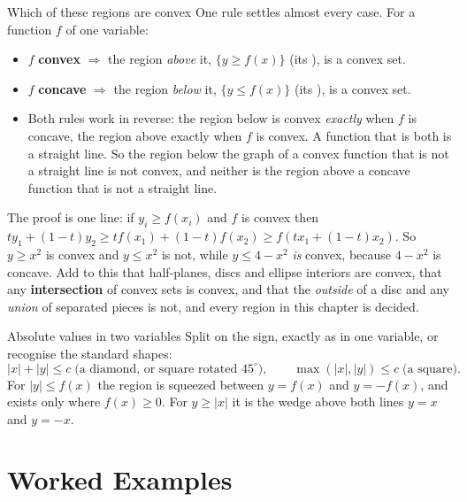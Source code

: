 \begin{rulebox}{Which of these regions are convex}
One rule settles almost every case. For a function $f$ of one variable:
\begin{itemize}[leftmargin=1.6em,itemsep=0.3ex]
  \item $f$ \textbf{convex} $\Longrightarrow$ the region \emph{above} it,
        $\{y\ge f(x)\}$ (its ), is a convex set.
  \item $f$ \textbf{concave} $\Longrightarrow$ the region \emph{below} it,
        $\{y\le f(x)\}$ (its ), is a convex set.
  \item Both rules work in reverse: the region below is convex
        \emph{exactly} when $f$ is concave, the region above exactly when
        $f$ is convex. A function that is both is a straight line. So the
        region below the graph of a convex function that is not a straight
        line is not convex, and neither is the region above a concave
        function that is not a straight line.
\end{itemize}
The proof is one line: if $y_{i}\ge f(x_{i})$ and $f$ is convex then
$ty_{1}+(1-t)y_{2}\ge tf(x_{1})+(1-t)f(x_{2})\ge f(tx_{1}+(1-t)x_{2})$.
So $y\ge x^{2}$ is convex and $y\le x^{2}$ is not, while $y\le4-x^{2}$
\emph{is} convex, because $4-x^{2}$ is concave. Add to this that
half-planes, discs and ellipse interiors are convex, that any
\textbf{intersection} of convex sets is convex, and that the
\emph{outside} of a disc and any \emph{union} of separated pieces is not,
and every region in this chapter is decided.
\end{rulebox}

\begin{rulebox}{Absolute values in two variables}
Split on the sign, exactly as in one variable, or recognise the standard
shapes:
\[
  |x|+|y|\le c \;\text{(a diamond, or square rotated }45^{\circ}),\qquad
  \max(|x|,|y|)\le c \;\text{(a square)} .
\]
For $|y|\le f(x)$ the region is squeezed between $y=f(x)$ and $y=-f(x)$,
and exists only where $f(x)\ge0$. For $y\ge|x|$ it is the wedge above both
lines $y=x$ and $y=-x$.
\end{rulebox}

\section{Worked Examples}


